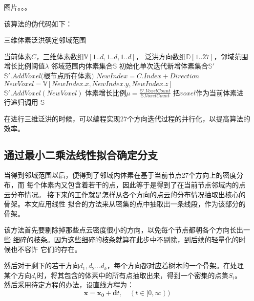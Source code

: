 图片。。。

该算法的伪代码如下：\\

\begin{algorithm} \label{alg:3dfld}
	\caption{三维体素泛洪确定邻域范围}
	\begin{algorithmic}[1]
		\Require 当前体素$C$，三维体素数组$\mathbb{V}[1..d,1..d,1..d]$，
		泛洪方向数组$\mathbb{D}[1..27]$，邻域范围增长比例阈值$\lambda$
		\Ensure	邻域范围内体素集合$\mathbb{S}$
		\State 初始化单次迭代新增体素集合$\mathbb{S'}$
		\State $\mathbb{S'}.AddVoxel($根节点所在体素$)$
			\State $NewIndex = C.Index + Direction$
			\State $NewVoxel = \mathbb{V}[NewIndex.x,NewIndex.y,NewIndex.z]$
				\State $\mathbb{S'}.AddVoxel(NewVoxel)$
			\EndIf
		\EndFor
		\State 体素增长比例$\mu=\frac{\mathbb{S'}.VoxelCount}{\mathbb{S}.VoxelCount}$
		\If{$\mu > \lambda$}
				\State 把$voxel$作为当前体素进行递归调用
			\EndFor
		\EndIf
		\State \Return $\mathbb{S}$
	\end{algorithmic}
\end{algorithm}

在进行三维泛洪的时候，可以编程实现27个方向迭代过程的并行化，以提高算法的效率。

\subsection{通过最小二乘法线性拟合确定分支}
当得到邻域范围以后，便得到了邻域内体素在基于当前节点27个方向上的密度分布，而
每个体素内又包含着若干的点，因此等于是得到了在当前节点邻域内的点云分布情况。
接下来的工作就是怎样从各个方向的点云的分布情况抽取出核心的骨架。本文应用线性
拟合的方法来从密集的点中抽取出一条线段，作为该部分的骨架。

该方法首先要剔除掉那些点云密度很小的方向，以免每个节点都朝各个方向长出一些
细碎的枝条。因为这些细碎的枝条就算在此步中不剔除，到后续的轻量化的时候也不容许
它们的存在。

然后对于剩下的若干方向$d_1,d_2...d_k$，每个方向都对应着树木的一个骨架。在处理
某个方向$d_i$时，将其包含的体素中的所有点抽取出来，得到一个密集的点集$S_i$。
然后采用待定方程的办法，设直线方程为：
\begin{equation}
	\mathbf{x} = \mathbf{x_0} + \mathbf{d}t,\quad(t \in [0,\infty))
\end{equation}


